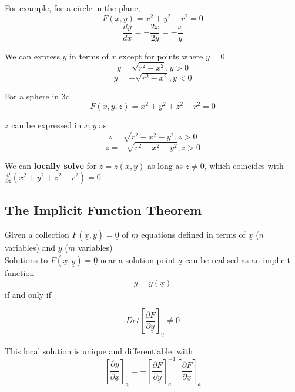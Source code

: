 For example, for a circle in the plane,
\[
  F(x,y) = x^2 + y^2 - r^2 = 0
\] 
\[
  \frac{dy}{dx} = - \frac{2x}{2y} = -\frac{x}{y}
\] 

We can express $y$ in terms of $x$ except for points where $y = 0$
\[
   y = \sqrt{r^2 - x^2}, y > 0
\] 
\[
   y = -\sqrt{r^2 - x^2}, y < 0
\] 

For a sphere in 3d
\[
  F(x, y, z) = x^2 + y^2 + z^2 - r^2 = 0
\] 

$z$ can be expressed in $x, y$ as \[
   z = \sqrt{r^2 - x^2 - y^2}, z > 0
\] 
\[
   z = -\sqrt{r^2 - x^2 - y^2}, z > 0
\] 

We can \textbf{locally solve} for $z = z(x, y)$ as long as $z \neq 0$, which coincides with  $ \frac{\partial }{\partial z}( x^2 + y^2 + z^2 -r^2) = 0$

\subsection{The Implicit Function Theorem}
\begin{framed}
   Given a collection $F( \underline{x}, \underline{y}) = \underline{0}$ of $m$ equations defined in terms of $ \underline{x}$ ($n$ variables) and $ \underline{y}$ ($m$ variables) \\

   Solutions to $F( \underline{x}, \underline{y}) = \underline{0} $ near a solution point $ \underline{a}$ can be realised as an implicit function 
   \[
     \underline{y} = \underline{y} ( \underline{x}) 
   \] if and only if

   \[
      Det \left[ \frac{\partial F}{\partial \underline{y}}\right]_{ \underline{a}} \neq 0
   \] 

   This local solution is unique and differentiable, with \[
      \left[ \frac{\partial \underline{y}}{\partial \underline{x}} \right]_{ \underline{a} } = 
      - \left[ \frac{\partial F}{\partial \underline{y}}  \right]^{-1}_{ \underline{a}} \left[ \frac{\partial F}{\partial \underline{x}}\right]_{ \underline{a}}
   \] 
  
\end{framed}









